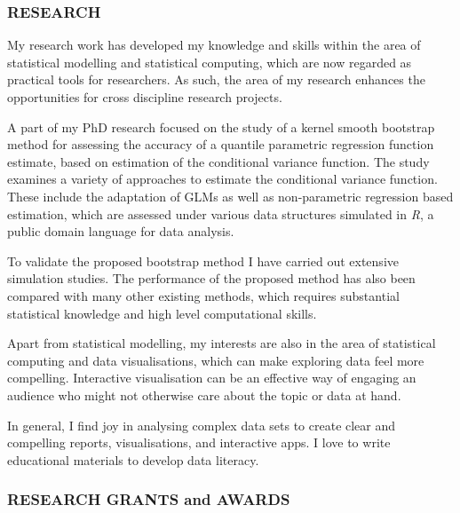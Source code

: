 \documentclass[
]{article}
\begin{document}
\hypertarget{research}{%
\subsubsection{RESEARCH}\label{research}}

My research work has developed my knowledge and skills within the area
of statistical modelling and statistical computing, which are now
regarded as practical tools for researchers. As such, the area of my
research enhances the opportunities for cross discipline research
projects.

A part of my PhD research focused on the study of a kernel smooth
bootstrap method for assessing the accuracy of a quantile parametric
regression function estimate, based on estimation of the conditional
variance function. The study examines a variety of approaches to
estimate the conditional variance function. These include the adaptation
of GLMs as well as non-parametric regression based estimation, which are
assessed under various data structures simulated in \emph{R}, a public
domain language for data analysis.

To validate the proposed bootstrap method I have carried out extensive
simulation studies. The performance of the proposed method has also been
compared with many other existing methods, which requires substantial
statistical knowledge and high level computational skills.

Apart from statistical modelling, my interests are also in the area of
statistical computing and data visualisations, which can make exploring
data feel more compelling. Interactive visualisation can be an effective
way of engaging an audience who might not otherwise care about the topic
or data at hand.

In general, I find joy in analysing complex data sets to create clear
and compelling reports, visualisations, and interactive apps. I love to
write educational materials to develop data literacy.

\hypertarget{research-grants-and-awards}{%
\subsubsection{RESEARCH GRANTS and
AWARDS}\label{research-grants-and-awards}}
\end{document}

